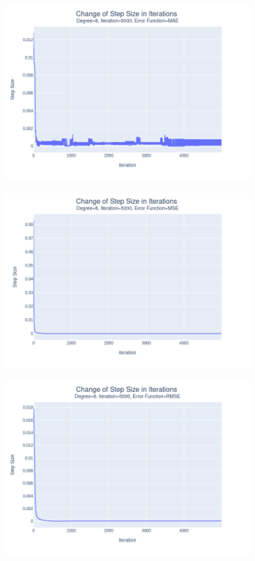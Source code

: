 \documentclass[14pt,a4]{article}
\begin{document}
\begin{figure}[h]
\begin{subfigure}{0.3\linewidth}
        \includegraphics[width=\textwidth]{images/implementation/q1/part_d/step_size/8_5000_MAE.png}
    \end{subfigure}
    \hfill
    \begin{subfigure}{0.3\textwidth}
        \centering
        \includegraphics[width=\textwidth]{images/implementation/q1/part_d/step_size/8_5000_MSE.png}
    \end{subfigure}
    \hfill
    \begin{subfigure}{0.3\linewidth}
        \centering
        \includegraphics[width=\textwidth]{images/implementation/q1/part_d/step_size/8_5000_RMSE.png}

\end{subfigure}
\end{figure}
\end{document}
